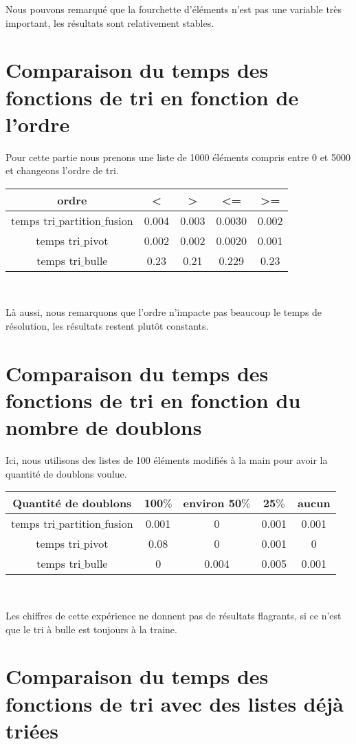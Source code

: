 \documentclass[a4paper, 12pt]{article}
\begin{document}
Nous pouvons remarqué que la fourchette d'éléments n'est pas une variable très important, les résultats sont relativement stables. 

\section{Comparaison du temps des fonctions de tri en fonction de l'ordre} 

Pour cette partie nous prenons une liste de 1000 éléments compris entre 0 et 5000 et changeons l'ordre de tri. \newline 

\begin{tabular}{|c|c|c|c|c|}
\hline 
ordre & < & > & <= & >= \\ 
\hline 
temps tri$\_$partition$\_$fusion & 0.004 & 0.003 &0.0030 & 0.002 \\ 
\hline 
temps tri$\_$pivot & 0.002 & 0.002 & 0.0020 & 0.001\\ 
\hline 
temps tri$\_$bulle & 0.23 & 0.21 & 0.229 & 0.23 \\ 
\hline  
\end{tabular} \\ \newline

Là aussi, nous remarquons que l'ordre n'impacte pas beaucoup le temps de résolution, les résultats restent plutôt constants. 

\section{Comparaison du temps des fonctions de tri en fonction du nombre de doublons}

Ici, nous utilisons des listes de 100 éléments modifiés à la main pour avoir la quantité de doublons voulue. \newline

\begin{tabular}{|c|c|c|c|c|}
\hline 
Quantité de doublons & 100$\%$ & environ 50$\%$ & 25$\%$ & aucun \\ 
\hline 
temps tri$\_$partition$\_$fusion & 0.001 & 0 &0.001 & 0.001 \\ 
\hline 
temps tri$\_$pivot & 0.08 & 0 & 0.001 & 0\\ 
\hline 
temps tri$\_$bulle & 0 & 0.004 & 0.005 & 0.001 \\ 
\hline  
\end{tabular} \\ \newline

Les chiffres de cette expérience ne donnent pas de résultats flagrants, si ce n'est que le tri à bulle est toujours à la traine. 
  
\section{Comparaison du temps des fonctions de tri avec des listes déjà triées }
\end{document}
